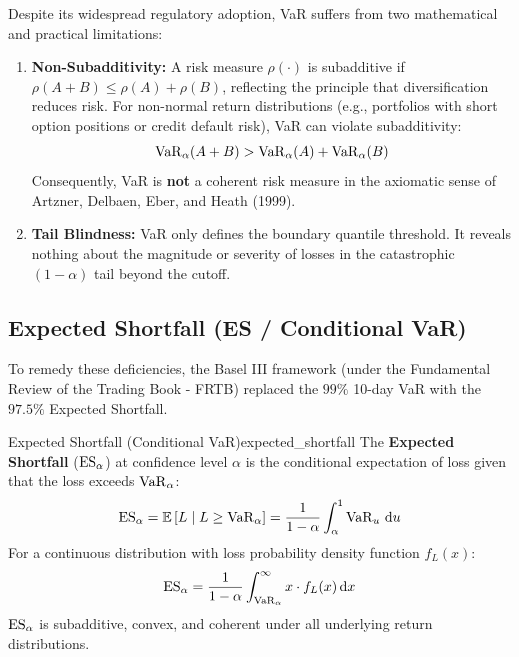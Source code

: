 Despite its widespread regulatory adoption, VaR suffers from two mathematical and practical limitations:
\begin{enumerate}[leftmargin=1.5em, itemsep=3pt]
    \item \textbf{Non-Subadditivity:} A risk measure $\rho(\cdot)$ is subadditive if $\rho(A + B) \le \rho(A) + \rho(B)$, reflecting the principle that diversification reduces risk. For non-normal return distributions (e.g., portfolios with short option positions or credit default risk), VaR can violate subadditivity:
    \begin{equation}
    \operatorname{VaR}_\alpha(A + B) > \operatorname{VaR}_\alpha(A) + \operatorname{VaR}_\alpha(B)
    \end{equation}
    Consequently, VaR is \textbf{not} a coherent risk measure in the axiomatic sense of Artzner, Delbaen, Eber, and Heath (1999).
    \item \textbf{Tail Blindness:} VaR only defines the boundary quantile threshold. It reveals nothing about the magnitude or severity of losses in the catastrophic $(1-\alpha)$ tail beyond the cutoff.
\end{enumerate}

\subsection{Expected Shortfall (ES / Conditional VaR)}

To remedy these deficiencies, the Basel III framework (under the Fundamental Review of the Trading Book - FRTB) replaced the $99\%$ 10-day VaR with the $97.5\%$ Expected Shortfall.

\begin{definition}{Expected Shortfall (Conditional VaR)}{expected_shortfall}
The \textbf{Expected Shortfall} ($\operatorname{ES}_\alpha$) at confidence level $\alpha$ is the conditional expectation of loss given that the loss exceeds $\operatorname{VaR}_\alpha$:
\begin{equation}
\operatorname{ES}_\alpha = \mathbb{E}\left[L \;\middle|\; L \ge \operatorname{VaR}_\alpha\right] = \frac{1}{1 - \alpha} \int_{\alpha}^{1} \operatorname{VaR}_u \, \mathrm{d} u
\end{equation}
For a continuous distribution with loss probability density function $f_L(x)$:
\begin{equation}
\operatorname{ES}_\alpha = \frac{1}{1 - \alpha} \int_{\operatorname{VaR}_\alpha}^{\infty} x \cdot f_L(x) \, \mathrm{d} x
\end{equation}
$\operatorname{ES}_\alpha$ is subadditive, convex, and coherent under all underlying return distributions.
\end{definition}

